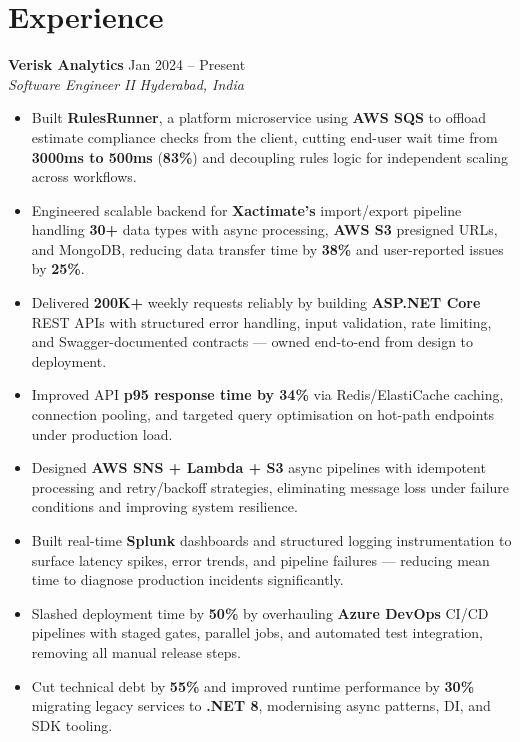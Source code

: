 \documentclass[10pt,letterpaper]{article}
\newcommand{\resumeSubheading}[4]{%
  \textbf{#1} \hfill #2 \\
  \textit{#3} \hfill \textit{#4} \\
}
\begin{document}
\section*{Experience}
\resumeSubheading{Verisk Analytics}{Jan 2024 -- Present}{Software Engineer II}{Hyderabad, India}
\begin{itemize}
    \item Built \textbf{RulesRunner}, a platform microservice using \textbf{AWS SQS} to offload estimate compliance checks from the client, cutting end-user wait time from \textbf{3000ms to 500ms} (\textbf{83\%}) and decoupling rules logic for independent scaling across workflows.
    \item Engineered scalable backend for \textbf{Xactimate's} import/export pipeline handling \textbf{30+} data types with async processing, \textbf{AWS S3} presigned URLs, and MongoDB, reducing data transfer time by \textbf{38\%} and user-reported issues by \textbf{25\%}.
    \item Delivered \textbf{200K+} weekly requests reliably by building \textbf{ASP.NET Core} REST APIs with structured error handling, input validation, rate limiting, and Swagger-documented contracts --- owned end-to-end from design to deployment.
    \item Improved API \textbf{p95 response time by 34\%} via Redis/ElastiCache caching, connection pooling, and targeted query optimisation on hot-path endpoints under production load.
    \item Designed \textbf{AWS SNS + Lambda + S3} async pipelines with idempotent processing and retry/backoff strategies, eliminating message loss under failure conditions and improving system resilience.
    \item Built real-time \textbf{Splunk} dashboards and structured logging instrumentation to surface latency spikes, error trends, and pipeline failures --- reducing mean time to diagnose production incidents significantly.
    \item Slashed deployment time by \textbf{50\%} by overhauling \textbf{Azure DevOps} CI/CD pipelines with staged gates, parallel jobs, and automated test integration, removing all manual release steps.
    \item Cut technical debt by \textbf{55\%} and improved runtime performance by \textbf{30\%} migrating legacy services to \textbf{.NET 8}, modernising async patterns, DI, and SDK tooling.
\end{itemize}

\end{document}
